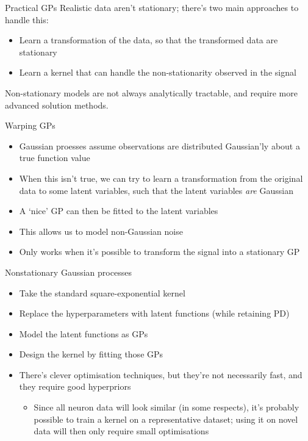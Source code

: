 \documentclass[presentation]{beamer}
\begin{document}
\begin{frame}[label={sec:org1f0937c}]{Practical GPs}
Realistic data aren't stationary; there's two main approaches to handle this:

\vfill

\begin{itemize}
\item Learn a transformation of the data, so that the transformed data are stationary
\item Learn a kernel that can handle the non-stationarity observed in the signal
\end{itemize}

\vfill

Non-stationary models are not always analytically tractable, and require more advanced solution methods.
\end{frame}

\begin{frame}[label={sec:orgdc47f38}]{Warping GPs}
\begin{itemize}
\item Gaussian proesses assume observations are distributed Gaussian'ly about a true function value
\item When this isn't true, we can try to learn a transformation from the original data to some latent variables, such that the latent variables \emph{are} Gaussian
\item A `nice' GP can then be fitted to the latent variables
\item This allows us to model non-Gaussian noise
\item Only works when it's possible to transform the signal into a stationary GP
\end{itemize}
\end{frame}

\begin{frame}[label={sec:orga1806d5}]{Nonstationary Gaussian processes}
\begin{itemize}
\item Take the standard square-exponential kernel
\item Replace the hyperparameters with latent functions (while retaining PD)
\item Model the latent functions as GPs
\item Design the kernel by fitting those GPs
\item There's clever optimisation techniques, \alert{but they're not necessarily fast, and they require good hyperpriors}
\begin{itemize}
\item Since all neuron data will look similar (in some respects), it's probably possible to train a kernel on a representative dataset; using it on novel data will then only require small optimisations
\end{itemize}
\end{itemize}
\end{frame}
\end{document}
